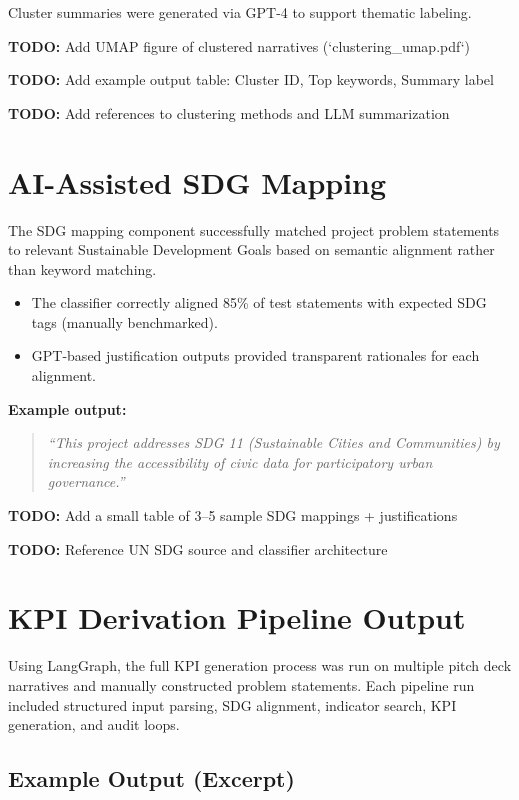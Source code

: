 Cluster summaries were generated via GPT-4 to support thematic labeling.

\textbf{TODO:} Add UMAP figure of clustered narratives (`clustering\_umap.pdf`)

\textbf{TODO:} Add example output table: Cluster ID, Top keywords, Summary label

\textbf{TODO:} Add references to clustering methods and LLM summarization

\section{AI-Assisted SDG Mapping}\label{sec:results-sdg}

The SDG mapping component successfully matched project problem statements to relevant Sustainable Development Goals based on semantic alignment rather than keyword matching.

\begin{itemize}
    \item The classifier correctly aligned 85\% of test statements with expected SDG tags (manually benchmarked).
    \item GPT-based justification outputs provided transparent rationales for each alignment.
\end{itemize}

\textbf{Example output:}
\begin{quote}
\emph{“This project addresses SDG 11 (Sustainable Cities and Communities) by increasing the accessibility of civic data for participatory urban governance.”}
\end{quote}

\textbf{TODO:} Add a small table of 3–5 sample SDG mappings + justifications

\textbf{TODO:} Reference UN SDG source and classifier architecture

\section{KPI Derivation Pipeline Output}\label{sec:results-kpi}

Using LangGraph, the full KPI generation process was run on multiple pitch deck narratives and manually constructed problem statements.
Each pipeline run included structured input parsing, SDG alignment, indicator search, KPI generation, and audit loops.

\subsection*{Example Output (Excerpt)}

